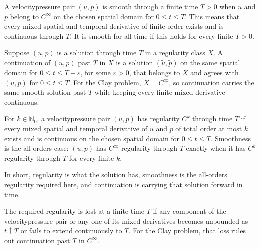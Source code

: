 
\begin{definition}[Smoothness]\label{def:Smoothness}
A velocity\textendash pressure pair \((u,p)\) is smooth through a finite time \(T>0\) when \(u\) and \(p\) belong to \(C^\infty\) on the chosen spatial domain for \(0\leq t\leq T\).
This means that every mixed spatial and temporal derivative of finite order exists and is continuous through \(T\).
It is smooth for all time if this holds for every finite \(T>0\).
\end{definition}

\begin{definition}[Continuation]\label{def:Continuation}
Suppose \((u,p)\) is a solution through time \(T\) in a regularity class \(X\).
A continuation of \((u,p)\) past \(T\) in \(X\) is a solution \((\widetilde u,\widetilde p)\) on the same spatial domain for \(0\leq t\leq T+\varepsilon\), for some \(\varepsilon>0\), that belongs to \(X\) and agrees with \((u,p)\) for \(0\leq t\leq T\).
For the Clay problem, \(X=C^\infty\), so continuation carries the same smooth solution past \(T\) while keeping every finite mixed derivative continuous.
\end{definition}

\begin{definition}[Regularity]\label{def:Regularity}
For \(k\in\mathbb N_0\), a velocity\textendash pressure pair \((u,p)\) has regularity \(C^k\) through time \(T\) if every mixed spatial and temporal derivative of \(u\) and \(p\) of total order at most \(k\) exists and is continuous on the chosen spatial domain for \(0\leq t\leq T\).
Smoothness is the all-orders case: \((u,p)\) has \(C^\infty\) regularity through \(T\) exactly when it has \(C^k\) regularity through \(T\) for every finite \(k\).
\end{definition}

In short, regularity is what the solution has, smoothness is the all-orders regularity required here, and continuation is carrying that solution forward in time.

The required regularity is lost at a finite time \(T\) if any component of the velocity\textendash pressure pair or any one of its mixed derivatives becomes unbounded as \(t\uparrow T\) or fails to extend continuously to \(T\).
For the Clay problem, that loss rules out continuation past \(T\) in \(C^\infty\).
